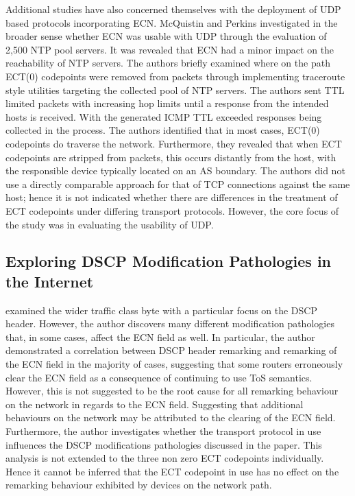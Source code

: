 \documentclass{l4proj}
\begin{document}
Additional studies have also concerned themselves with the deployment of UDP based protocols incorporating ECN. McQuistin and Perkins\cite{mcquistin_is_2015} investigated in the broader sense whether ECN was usable with UDP through the evaluation of 2,500 NTP pool servers. It was revealed that ECN had a minor impact on the reachability of NTP servers. The authors briefly examined where on the path ECT(0) codepoints were removed from packets through implementing traceroute style utilities targeting the collected pool of NTP servers. The authors sent TTL limited packets with increasing hop limits until a response from the intended hosts is received. With the generated ICMP TTL exceeded responses being collected in the process. The authors identified that in most cases, ECT(0) codepoints do traverse the network. Furthermore, they revealed that when ECT codepoints are stripped from packets, this occurs distantly from the host, with the responsible device typically located on an AS boundary. The authors did not use a directly comparable approach for that of TCP connections against the same host; hence it is not indicated whether there are differences in the treatment of ECT codepoints under differing transport protocols. However, the core focus of the study was in evaluating the usability of UDP.

\subsection{Exploring DSCP Modification Pathologies in the Internet}

\cite{custura_exploring_2017} examined the wider traffic class byte with a particular focus on the DSCP header. However, the author discovers many different modification pathologies that, in some cases, affect the ECN field as well. In particular, the author demonstrated a correlation between DSCP header remarking and remarking of the ECN field in the majority of cases, suggesting that some routers erroneously clear the ECN field as a consequence of continuing to use ToS semantics. However, this is not suggested to be the root cause for all remarking behaviour on the network in regards to the ECN field. Suggesting that additional behaviours on the network may be attributed to the clearing of the ECN field. Furthermore, the author investigates whether the transport protocol in use influences the DSCP modifications pathologies discussed in the paper. This analysis is not extended to the three non zero ECT codepoints individually. Hence it cannot be inferred that the ECT codepoint in use has no effect on the remarking behaviour exhibited by devices on the network path.
\end{document}
